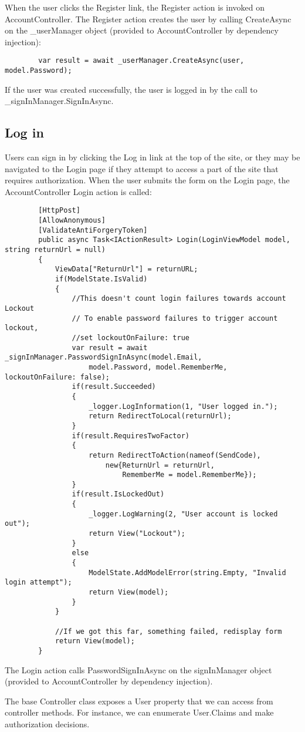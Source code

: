 \documentclass{report}
\begin{document}
    When the user clicks the Register link, the Register action is invoked on
    AccountController. The Register action creates the user by calling CreateAsync
    on the _userManager object (provided to AccountController by dependency injection):

    \lstset{style=sharpc}
    \begin{lstlisting}
        var result = await _userManager.CreateAsync(user, model.Password);
    \end{lstlisting}
    
    If the user was created successfully, the user is logged in by the call
    to _signInManager.SignInAsync.

    \subsection{Log in}
    Users can sign in by clicking the Log in link at the top of the site,
    or they may be navigated to the Login page if they attempt to access
    a part of the site that requires authorization. When the user submits
    the form on the Login page, the AccountController Login action is
    called:
    \lstset{style=sharpc}
    \begin{lstlisting}
        [HttpPost]
        [AllowAnonymous]
        [ValidateAntiForgeryToken]
        public async Task<IActionResult> Login(LoginViewModel model, string returnUrl = null)
        {
            ViewData["ReturnUrl"] = returnURL;
            if(ModelState.IsValid)
            {
                //This doesn't count login failures towards account Lockout
                // To enable password failures to trigger account lockout,
                //set lockoutOnFailure: true
                var result = await _signInManager.PasswordSignInAsync(model.Email,
                    model.Password, model.RememberMe, lockoutOnFailure: false);
                if(result.Succeeded)
                {
                    _logger.LogInformation(1, "User logged in.");
                    return RedirectToLocal(returnUrl);
                }
                if(result.RequiresTwoFactor)
                {
                    return RedirectToAction(nameof(SendCode),
                        new{ReturnUrl = returnUrl,
                            RememberMe = model.RememberMe});
                }
                if(result.IsLockedOut)
                {
                    _logger.LogWarning(2, "User account is locked out");
                    return View("Lockout");
                }
                else
                {
                    ModelState.AddModelError(string.Empty, "Invalid login attempt");
                    return View(model);
                }
            }

            //If we got this far, something failed, redisplay form
            return View(model);
        }
    \end{lstlisting}

    The Login action calls PasswordSignInAsync on the signInManager object
    (provided to AccountController by dependency injection).

    The base Controller class exposes a User property that we can access from
    controller methods. For instance, we can enumerate User.Claims and make
    authorization decisions.
\end{document}
